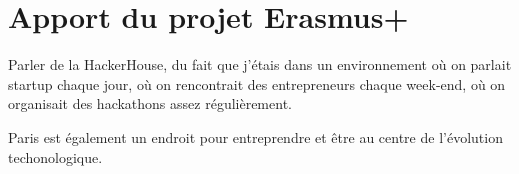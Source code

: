 \section{Apport du projet Erasmus+}

Parler de la HackerHouse, du fait que j'étais dans un environnement où on
parlait startup chaque jour, où on rencontrait des entrepreneurs chaque
week-end, où on organisait des hackathons assez régulièrement.

Paris est également un endroit pour entreprendre et être au centre de
l'évolution techonologique.